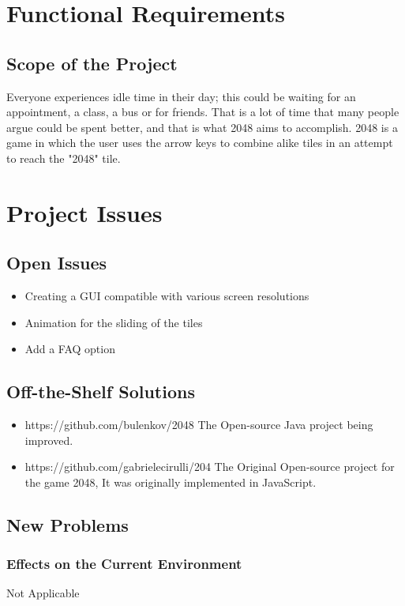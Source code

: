 \documentclass[12pt]{article}
\begin{document}
\section{Functional Requirements}
\subsection{Scope of the Project}
Everyone experiences idle time in their day; this could be waiting for an 
appointment, a class, a bus or for friends. That is a lot of time that many 
people argue could be spent better, and that is what 2048 aims to accomplish. 
2048 is a game in which the user uses the arrow keys to combine alike tiles in 
an attempt to reach the "2048" tile.\\

\section{Project Issues}
\subsection{Open Issues}
\begin{itemize}
	\item Creating a GUI compatible with various screen resolutions
	\item Animation for the sliding of the tiles
	\item Add a FAQ option
\end{itemize}

\subsection{Off-the-Shelf Solutions}
\begin{itemize}
	\item https://github.com/bulenkov/2048 The Open-source Java project being 
	improved.
	\item https://github.com/gabrielecirulli/204 The Original Open-source 
	project for the game 2048, It was originally implemented in JavaScript.
\end{itemize}

\subsection{New Problems}
\subsubsection{Effects on the Current Environment}
Not Applicable
\end{document}
